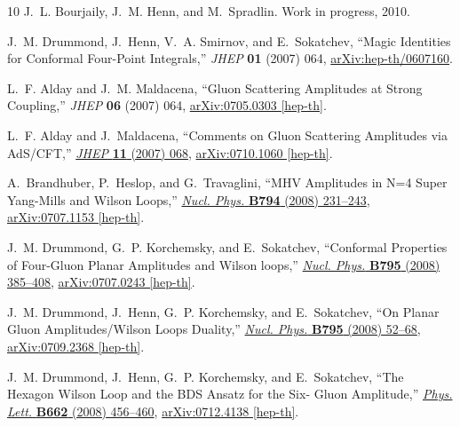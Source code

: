 \documentclass[11pt, reqno]{article}
\begin{document}
\begin{thebibliography}{10}
J.~L. Bourjaily, J.~M. Henn, and M.~Spradlin. Work in progress, 2010.

J.~M. Drummond, J.~Henn, V.~A. Smirnov, and E.~Sokatchev, ``{Magic Identities
  for Conformal Four-Point Integrals},'' {\em JHEP} {\bf 01} (2007)  064,
\href{http://arxiv.org/abs/hep-th/0607160}{{ arXiv:hep-th/0607160}}.

L.~F. Alday and J.~M. Maldacena, ``{Gluon Scattering Amplitudes at Strong
  Coupling},'' {\em JHEP} {\bf 06} (2007)  064,
\href{http://arxiv.org/abs/0705.0303}{{ arXiv:0705.0303 [hep-th]}}.

L.~F. Alday and J.~Maldacena, ``{Comments on Gluon Scattering Amplitudes via
  AdS/CFT},'' \href{http://dx.doi.org/10.1088/1126-6708/2007/11/068}{{\em JHEP}
  {\bf 11} (2007)  068},
\href{http://arxiv.org/abs/0710.1060}{{ arXiv:0710.1060 [hep-th]}}.

A.~Brandhuber, P.~Heslop, and G.~Travaglini, ``{MHV Amplitudes in N=4 Super
  Yang-Mills and Wilson Loops},''
  \href{http://dx.doi.org/10.1016/j.nuclphysb.2007.11.002}{{\em Nucl. Phys.}
  {\bf B794} (2008)  231--243},
\href{http://arxiv.org/abs/0707.1153}{{ arXiv:0707.1153 [hep-th]}}.

J.~M. Drummond, G.~P. Korchemsky, and E.~Sokatchev, ``{Conformal Properties of
  Four-Gluon Planar Amplitudes and Wilson loops},''
  \href{http://dx.doi.org/10.1016/j.nuclphysb.2007.11.041}{{\em Nucl. Phys.}
  {\bf B795} (2008)  385--408},
\href{http://arxiv.org/abs/0707.0243}{{ arXiv:0707.0243 [hep-th]}}.

J.~M. Drummond, J.~Henn, G.~P. Korchemsky, and E.~Sokatchev, ``{On Planar Gluon
  Amplitudes/Wilson Loops Duality},''
  \href{http://dx.doi.org/10.1016/j.nuclphysb.2007.11.007}{{\em Nucl. Phys.}
  {\bf B795} (2008)  52--68},
\href{http://arxiv.org/abs/0709.2368}{{ arXiv:0709.2368 [hep-th]}}.

J.~M. Drummond, J.~Henn, G.~P. Korchemsky, and E.~Sokatchev, ``{The Hexagon
  Wilson Loop and the BDS Ansatz for the Six- Gluon Amplitude},''
  \href{http://dx.doi.org/10.1016/j.physletb.2008.03.032}{{\em Phys. Lett.}
  {\bf B662} (2008)  456--460},
\href{http://arxiv.org/abs/0712.4138}{{ arXiv:0712.4138 [hep-th]}}.


\end{thebibliography}
\end{document}
